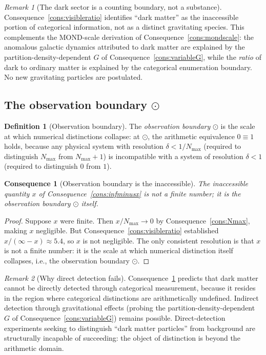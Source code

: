 \documentclass[11pt,twocolumn,a4paper]{article}
\theoremstyle{axiomstyle}
\theoremstyle{conseqstyle}
\newtheorem{consequence}{Consequence}
\theoremstyle{definition}
\newtheorem{definition}{Definition}
\theoremstyle{remark}
\newtheorem*{remark}{Remark}
\begin{document}
\begin{remark}[The dark sector is a counting boundary, not a substance]
Consequence~\ref{cons:visibleratio} identifies ``dark matter'' as the inaccessible portion of categorical information, not as a distinct gravitating species. This complements the MOND-scale derivation of Consequence~\ref{cons:mondscale}: the anomalous galactic dynamics attributed to dark matter are explained by the partition-density-dependent $G$ of Consequence~\ref{cons:variableG}, while the \emph{ratio} of dark to ordinary matter is explained by the categorical enumeration boundary. No new gravitating particles are postulated.
\end{remark}

\subsection{The observation boundary $\odot$}

\begin{definition}[Observation boundary]\label{def:obsboundary}
The \emph{observation boundary} $\odot$ is the scale at which numerical distinctions collapse: at $\odot$, the arithmetic equivalence $0\equiv 1$ holds, because any physical system with resolution $\delta<1/N_{\max}$ (required to distinguish $N_{\max}$ from $N_{\max}+1$) is incompatible with a system of resolution $\delta<1$ (required to distinguish $0$ from $1$).
\end{definition}

\begin{consequence}[Observation boundary is the inaccessible]\label{cons:obsboundaryisx}
The inaccessible quantity $x$ of Consequence~\ref{cons:infminusx} is not a finite number; it is the observation boundary $\odot$ itself.
\end{consequence}

\begin{proof}
Suppose $x$ were finite. Then $x/N_{\max}\to 0$ by Consequence~\ref{cons:Nmax}, making $x$ negligible. But Consequence~\ref{cons:visibleratio} established $x/(\infty-x)\approx 5.4$, so $x$ is not negligible. The only consistent resolution is that $x$ is not a finite number: it is the scale at which numerical distinction itself collapses, i.e., the observation boundary $\odot$.
\end{proof}

\begin{remark}[Why direct detection fails]
Consequence~\ref{cons:obsboundaryisx} predicts that dark matter cannot be directly detected through categorical measurement, because it resides in the region where categorical distinctions are arithmetically undefined. Indirect detection through gravitational effects (probing the partition-density-dependent $G$ of Consequence~\ref{cons:variableG}) remains possible. Direct-detection experiments seeking to distinguish ``dark matter particles'' from background are structurally incapable of succeeding: the object of distinction is beyond the arithmetic domain.
\end{remark}
\end{document}
